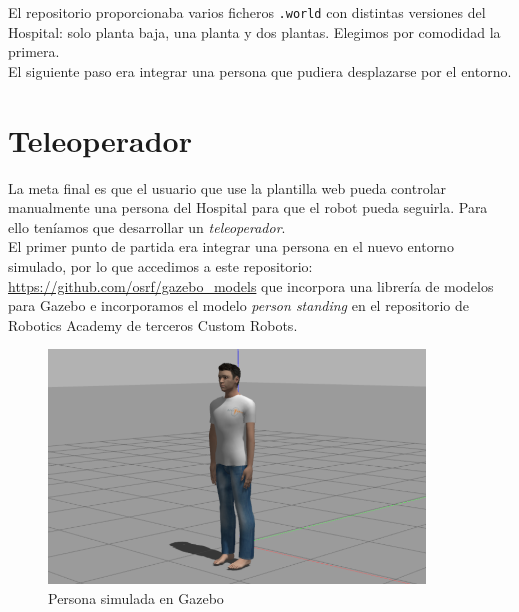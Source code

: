 El repositorio proporcionaba varios ficheros \texttt{.world} con distintas versiones del Hospital: solo planta baja, una planta y dos plantas. Elegimos por comodidad la primera.\\

El siguiente paso era integrar una persona que pudiera desplazarse por el entorno.\\



\section{Teleoperador}
\label{sec:teleoperador}

La meta final es que el usuario que use la plantilla web pueda controlar manualmente una persona del Hospital para que el robot pueda seguirla. Para ello teníamos que desarrollar un \textit{teleoperador}.\\

El primer punto de partida era integrar una persona en el nuevo entorno simulado, por lo que accedimos a este repositorio: \url{https://github.com/osrf/gazebo_models} que incorpora una librería de modelos para Gazebo e incorporamos el modelo \textit{person standing} en el repositorio de Robotics Academy de terceros Custom Robots.\\

\begin{figure} [H]
  \begin{center}
    \includegraphics[width=10cm]{imagenes/cap5/person_model.png}
  \end{center}
  \caption[Persona simulada en Gazebo]{Persona simulada en Gazebo}
  \label{fig:persona_gazebo}
\end{figure}\

